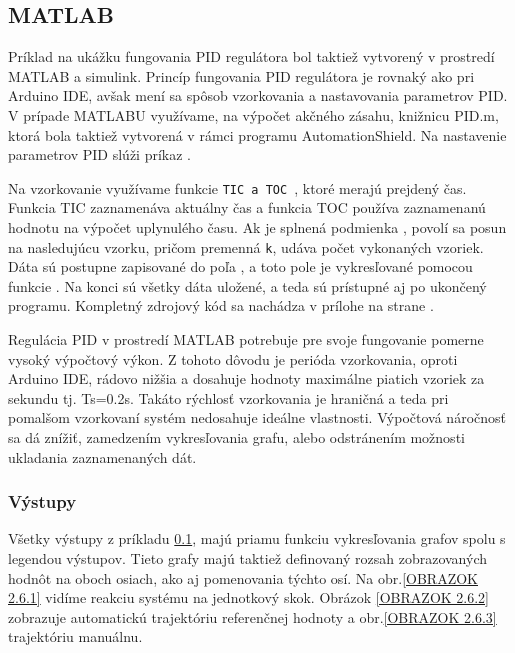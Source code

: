 \newpage
\subsection{MATLAB}
\label{MATLABPID}

Príklad na ukážku fungovania PID regulátora bol taktiež vytvorený v prostredí MATLAB a simulink. Princíp fungovania PID regulátora je rovnaký ako pri Arduino IDE, avšak mení sa spôsob vzorkovania a nastavovania parametrov PID. V prípade MATLABU využívame, na výpočet akčného zásahu, knižnicu PID.m, ktorá bola taktiež vytvorená v rámci programu AutomationShield. Na nastavenie parametrov PID slúži príkaz . 

Na vzorkovanie využívame funkcie \verb|TIC a TOC |, ktoré merajú prejdený čas. Funkcia TIC zaznamenáva aktuálny čas a funkcia TOC používa zaznamenanú hodnotu na výpočet uplynulého času. Ak je splnená podmienka , povolí sa posun na nasledujúcu vzorku, pričom premenná \verb*|k|, udáva počet vykonaných vzoriek. Dáta sú postupne zapisované do poľa , a toto pole je vykresľované pomocou funkcie . Na konci sú všetky dáta uložené, a teda sú prístupné aj po ukončený programu. Kompletný zdrojový kód sa nachádza v prílohe na strane \pageref{AeroShieldPID.m}.

Regulácia PID v prostredí MATLAB potrebuje pre svoje fungovanie pomerne vysoký výpočtový výkon. Z tohoto dôvodu je perióda vzorkovania, oproti Arduino IDE, rádovo nižšia a dosahuje hodnoty maximálne piatich vzoriek za sekundu tj. Ts=0.2s. Takáto rýchlosť vzorkovania je hraničná a teda pri pomalšom vzorkovaní systém nedosahuje ideálne vlastnosti. Výpočtová náročnosť sa dá znížiť, zamedzením vykresľovania grafu, alebo odstránením možnosti ukladania zaznamenaných dát. 


\subsubsection{Výstupy}

Všetky výstupy z príkladu \ref{MATLABPID}, majú priamu funkciu vykresľovania grafov spolu s legendou výstupov. Tieto grafy majú taktiež definovaný rozsah zobrazovaných hodnôt na oboch osiach, ako aj pomenovania týchto osí. Na obr.\ref{OBRAZOK 2.6.1} vidíme reakciu systému na jednotkový skok. Obrázok \ref{OBRAZOK 2.6.2} zobrazuje automatickú trajektóriu referenčnej hodnoty a obr.\ref{OBRAZOK 2.6.3} trajektóriu manuálnu. 

